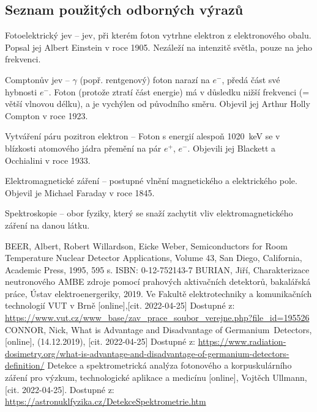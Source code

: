 \documentclass[12pt,a4paper]{article}
\newcommand{\citovano}{[cit. 2022-04-25] }
\newcommand{\e}{$e^-$}
\begin{document}
\begin{spacing}{1.5}
\section*{Seznam použitých odborných výrazů}
\begin{list}{}{}
	\item [Fotoelektrický jev] -- jev, při kterém foton vytrhne elektron z elektronového obalu. Popsal jej Albert Einstein v roce 1905. Nezáleží na intenzitě světla, pouze na jeho frekvenci. 
	\item [Comptonův jev] -- $\gamma$ (popř. rentgenový) foton narazí na \e, předá část své hybnosti \e. Foton (protože ztratí část energie) má v důsledku nižší frekvenci (= větší vlnovou délku), a je vychýlen od původního směru. Objevil jej  Arthur Holly Compton v roce 1923.
	\item [Vytváření páru pozitron elektron] -- Foton s energií alespoň \SI{1020}{\kilo\electronvolt} se v blízkosti atomového jádra přemění na pár $e^{+}$, $e^{-}$. Objevili jej Blackett a Occhialini v roce 1933.
	\item [Elektromagnetické záření] -- postupné vlnění magnetického a elektrického pole. Objevil je Michael Faraday v roce 1845. 
	\item [Spektroskopie] -- obor fyziky, který se snaží zachytit vliv elektromagnetického záření na danou látku.
\end{list}
\newpage
{}
\renewcommand\refname{Seznam literatury, pramenů a internetových zdrojů}
\begin{thebibliography}{}
	 BEER, Albert, Robert Willardson, Eicke Weber, Semiconductors for Room Temperature Nuclear Detector Applications, Volume 43, San Diego, California, Academic Press, 1995, 595 s. ISBN: 0-12-752143-7
	 BURIAN, Jiří, Charakterizace neutronového AMBE zdroje pomocí prahových aktivačních detektorů, bakalářská práce, Ústav elektroenergeriky, 2019. Ve Fakultě elektrotechniky a komunikačních technologií VUT v Brně [online],\citovano Dostupné z: \url{https://www.vut.cz/www_base/zav_prace_soubor_verejne.php?file_id=195526}
	 CONNOR, Nick, What is Advantage and Disadvantage of Germanium~Detectors, [online], (14.12.2019), \citovano Dostupné z: \url{https://www.radiation-dosimetry.org/what-is-advantage-and-disadvantage-of-germanium-detectors-definition/}%
	 Detekce a spektrometrická analýza fotonového a korpuskulárního záření pro výzkum, technologické aplikace a medicínu [online], Vojtěch Ullmann, [cit. 2022-04-25]. Dostupné z: \url{https://astronuklfyzika.cz/DetekceSpektrometrie.htm}

\end{thebibliography}
\end{spacing}
\end{document}
